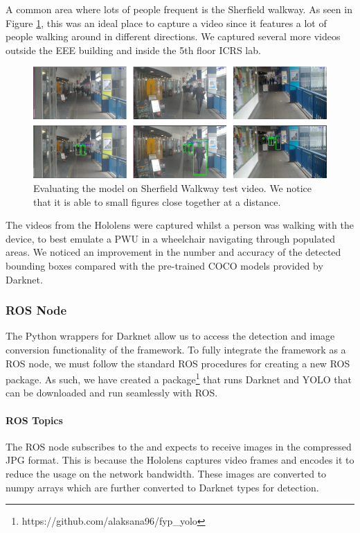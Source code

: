 A common area where lots of people frequent is the Sherfield walkway. As seen in Figure \ref{fig:yoloSherfield}, this was an ideal place to capture a video since it features a lot of people walking around in different directions. We captured several more videos outside the EEE building and inside the 5th floor ICRS lab.

\begin{figure}[ht]
	\centering
	\includegraphics[width=0.95\linewidth]{img/chapter5_implementation/yoloWalkwayMultiple.png}
	\caption{Evaluating the model on Sherfield Walkway test video. We notice that it is able to small figures close together at a distance.}
	\label{fig:yoloSherfield}
\end{figure}

The videos from the Hololens were captured whilst a person was walking with the device, to best emulate a PWU in a wheelchair navigating through populated areas. We noticed an improvement in the number and accuracy of the detected bounding boxes compared with the pre-trained COCO models provided by Darknet. 



\subsubsection{ROS Node} \label{sec:nodeYOLO}
The Python wrappers for Darknet allow us to access the detection and image conversion functionality of the framework. To fully integrate the framework as a ROS node, we must follow the standard ROS procedures for creating a new ROS package. As such, we have created a package\footnote{https://github.com/alaksana96/fyp\_yolo} that runs Darknet and YOLO that can be downloaded and run seamlessly with ROS.

\paragraph{ROS Topics} The ROS node subscribes to the  and expects to receive images in the compressed JPG format. This is because the Hololens captures video frames and encodes it to reduce the usage on the network bandwidth. These images are converted to numpy arrays which are further converted to Darknet  types for detection. 

